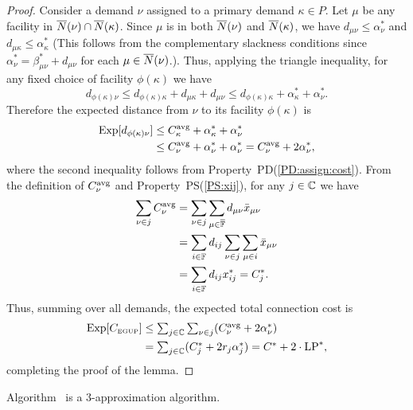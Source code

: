 \documentclass[11pt]{article}
\begin{document}
\begin{proof}
  Consider a demand $\nu$ assigned to a primary demand
  $\kappa\in P$. Let $\mu$ be any facility in ${\overline{N}}(\nu)
  \cap {\overline{N}}(\kappa)$.  Since $\mu$ is in both
  ${\overline{N}}(\nu)$ and ${\overline{N}}(\kappa)$, we have $d_{\mu\nu}
  \leq \alpha_{\nu}^\ast$ and $d_{\mu\kappa} \leq
  \alpha_{\kappa}^\ast$ (This follows from the complementary
  slackness conditions since
  $\alpha_{\nu}^\ast=\beta_{\mu\nu}^\ast + d_{\mu\nu}$ for
  each $\mu\in {\overline{N}}(\nu)$.). Thus, applying the triangle
  inequality, for any fixed choice of facility
  $\phi(\kappa)$ we have
%
\begin{equation*}
    d_{\phi(\kappa)\nu} \leq d_{\phi(\kappa)\kappa}+d_{\mu\kappa}+d_{\mu\nu}
    \leq d_{\phi(\kappa)\kappa} + \alpha_{\kappa}^\ast + \alpha_{\nu}^\ast.
\end{equation*}
%
Therefore the expected distance from $\nu$ to its facility $\phi(\kappa)$ is 
%
\begin{align*}
  \mbox{\rm Exp}[  d_{\phi(\kappa)\nu}   ] &\le C^{{\mbox{\scriptsize\rm avg}}}_{\kappa} + \alpha_{\kappa}^\ast + \alpha_{\nu}^\ast 
\\
  &\leq C^{{\mbox{\scriptsize\rm avg}}}_{\nu} + \alpha_{\nu}^\ast + \alpha_{\nu}^\ast
   = C^{{\mbox{\scriptsize\rm avg}}}_{\nu} + 2\alpha_{\nu}^\ast,
  \end{align*}
%
  where the second inequality follows from Property~PD(\ref{PD:assign:cost}).  
From the definition of $C^{{\mbox{\scriptsize\rm avg}}}_{\nu}$ and Property~PS(\ref{PS:xij}), for any $j\in \mathbb{C}$ 
we have
%
\begin{align*}
\sum_{\nu\in j} C^{{\mbox{\scriptsize\rm avg}}}_{\nu} &= \sum_{\nu\in j}\sum_{\mu\in\overline{\mathbb{F}}}d_{\mu\nu}{\bar x}_{\mu\nu}
			\\
 			&= \sum_{i\in\mathbb{F}} d_{ij}\sum_{\nu\in j}\sum_{\mu\in i}{\bar x}_{\mu\nu}
			\\
			&= \sum_{i\in\mathbb{F}} d_{ij}x^\ast_{ij} 
			= C^\ast_j.
\end{align*}
% 
Thus, summing over all demands, the expected total connection cost is
%
\begin{align*}
    \mbox{\rm Exp}[C_{\mbox{\tiny\rm EGUP}}] &\le 
			\textstyle{\sum_{j\in\mathbb{C}} \sum_{\nu\in j}} (C^{{\mbox{\scriptsize\rm avg}}}_{\nu} + 2\alpha_{\nu}^\ast) 
			\\
    	& = \textstyle{\sum_{j\in\mathbb{C}}} (C_j^\ast + 2r_j\alpha_j^\ast)
 		= C^\ast + 2\cdot\mbox{\rm LP}^\ast,
\end{align*}
%
completing the proof of the lemma.
\end{proof}


\begin{theorem}
Algorithm~{\EGUP} is a $3$-approximation algorithm.
\end{theorem}
\end{document}
